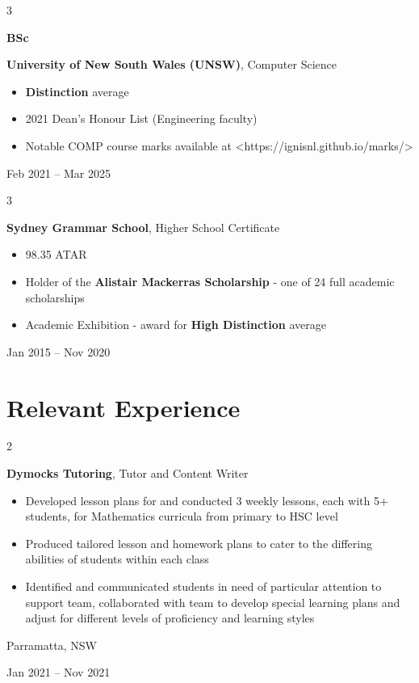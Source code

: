 \documentclass[10pt, a4paper]{article}
\newenvironment{highlights}{
    \begin{itemize}[
        topsep=0.10 cm,
        parsep=0.10 cm,
        partopsep=0pt,
        itemsep=0pt,
        leftmargin=0.4 cm + 10pt
    ]
}{
    \end{itemize}
} %
\newenvironment{twocolentry}[2][]{
    \onecolentry
    \def\secondColumn{#2}
    \setcolumnwidth{\fill, 4.5 cm}
    \begin{paracol}{2}
}{
    \switchcolumn \raggedleft \secondColumn
    \end{paracol}
    \endonecolentry
} %
\newenvironment{threecolentry}[3][]{
    \onecolentry
    \def\thirdColumn{#3}
    \setcolumnwidth{1 cm, \fill, 4.5 cm}
    \begin{paracol}{3}
    {\raggedright #2} \switchcolumn
}{
    \switchcolumn \raggedleft \thirdColumn
    \end{paracol}
    \endonecolentry
} %
\begin{document}
        
        \begin{threecolentry}{\textbf{BSc}}{
            Feb 2021 – Mar 2025
        }
            \textbf{University of New South Wales (UNSW)}, Computer Science
            \begin{highlights}
                \item \textbf{Distinction} average
                \item 2021 Dean's Honour List (Engineering faculty)
                \item Notable COMP course marks available at <https://ignisnl.github.io/marks/>
            \end{highlights}
        \end{threecolentry}

        \vspace{0.2 cm}

        \begin{threecolentry}{\textbf{}}{
            Jan 2015 – Nov 2020
        }
            \textbf{Sydney Grammar School}, Higher School Certificate
            \begin{highlights}
                \item 98.35 ATAR
                \item Holder of the \textbf{Alistair Mackerras Scholarship} - one of 24 full academic scholarships
                \item Academic Exhibition - award for \textbf{High Distinction} average
            \end{highlights}
        \end{threecolentry}


    
    \section{Relevant Experience}



        
        \begin{twocolentry}{
            Parramatta, NSW

        Jan 2021 – Nov 2021
        }
            \textbf{Dymocks Tutoring}, Tutor and Content Writer
            \begin{highlights}
                \item Developed lesson plans for and conducted 3 weekly lessons, each with 5+ students, for Mathematics curricula from primary to HSC level
                \item Produced tailored lesson and homework plans to cater to the differing abilities of students within each class
                \item Identified and communicated students in need of particular attention to support team, collaborated with team to develop special learning plans and adjust for different levels of proficiency and learning styles
            \end{highlights}
        \end{twocolentry}
\end{document}
